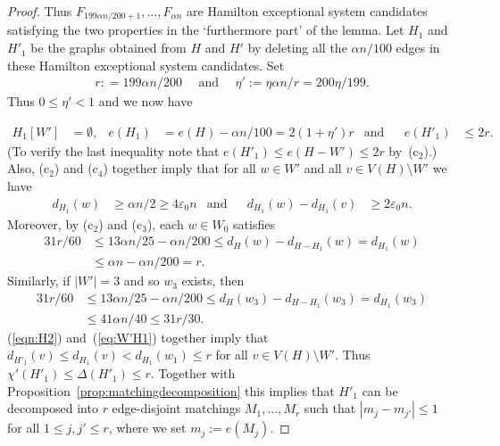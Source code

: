 \documentclass{memo-l}
\def\COMMENT#1{}
\def\eps{\varepsilon}
\def\epszero{\eps_0}
\numberwithin{section}{chapter}
\numberwithin{equation}{section}
\numberwithin{firstthm}{section}
\numberwithin{figure}{section}
\begin{document}
{\begin{proof}
Thus $F_{199\alpha n/200+1},\dots,F_{\alpha n}$ are Hamilton exceptional system candidates
satisfying the two properties in the `furthermore part' of the lemma.
Let $H_1$ and $H'_1$ be the graphs obtained from $H$ and $H'$ by deleting all the $\alpha n/100$ edges in these Hamilton exceptional system candidates.
Set
\begin{align}\label{eq:eta'}
r : = 199\alpha n/200 \ \ \ \ \ \  \text{and} \ \ \ \ \ \ \eta' := \eta \alpha n/r=200\eta/199.
\end{align}
Thus $0\le \eta'<1$ and we now have%
   \COMMENT{Note that $e(H)-\alpha n/100=2 ( 1 + \eta )\alpha n -\alpha n/100=2(199/200+\eta )\alpha n=2 ( 1 + \eta' )199\alpha n/200$.}
\begin{align}
	H_1[W'] & = \emptyset, 
	& e(H_1) & = e(H)-\alpha n/100=2 ( 1 + \eta' )r 
	& \text{and} &
	& e(H'_1) & \le 2 r.
	\label{eqn:H}
\end{align}
(To verify the last inequality note that $e(H'_1) \le e(H-W')\le 2 r$ by~(c$_2$).)
Also, (c$_2$) and (c$_4$) together imply that for all $w \in W'$ and all $v \in V(H) \setminus W'$ we have
\begin{align}
d_{H_1}(w) & \ge \alpha n/2\ge 4 \epszero n  & \text{and} & &d_{H_1}(w) - d_{H_1}(v) &\ge 2 \epszero n . \label{eqn:H2}
\end{align}
Moreover, by (c$_2$) and (c$_3$), each $w \in W_0$ satisfies
\begin{align}\label{eq:W'H1}
	31r/60 & \le 13\alpha n/25- \alpha n/200\le d_{H}(w)-d_{H-H_1}(w)=  d_{H_1}(w)\nonumber \\
 & \le \alpha n-\alpha n/200= r .
\end{align}
Similarly, if $|W'|=3$ and so $w_3$ exists, then
\begin{align}\label{eq:W'H1w3}
	31r/60 & \le 13\alpha n/25- \alpha n/200 \le d_{H}(w_3)-d_{H-H_1}(w_3)=d_{H_1}(w_3)\nonumber \\
& \le 41\alpha n/40\le 31r/30.
\end{align}
(\ref{eqn:H2}) and~(\ref{eq:W'H1}) together imply that $d_{H'_1}(v) \le d_{H_1}(v)< d_{H_1}(w_1)\le r $ for all $v\in V(H)\setminus W'$.
Thus $\chi'(H'_1)\le \Delta(H'_1)\le r$.
Together with Proposition~\ref{prop:matchingdecomposition} this implies that $H'_1$ can be decomposed into $r$ edge-disjoint matchings 
$M_1, \dots ,M_{r}$
such that $| m_j- m_{j'}| \le 1$ for all $1 \le j , j' \le r$, where we set $m_j := e(M_j)$.


\end{proof}}
\end{document}
